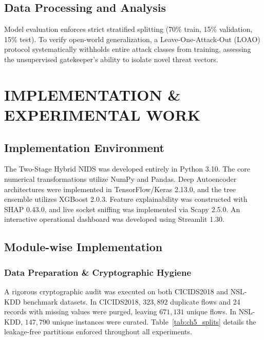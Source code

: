 \documentclass[12pt,a4paper]{report}
\begin{document}
\section{Data Processing and Analysis}
Model evaluation enforces strict stratified splitting (70\% train, 15\% validation, 15\% test). To verify open-world generalization, a Leave-One-Attack-Out (LOAO) protocol systematically withholds entire attack classes from training, assessing the unsupervised gatekeeper's ability to isolate novel threat vectors.

\chapter{IMPLEMENTATION \& EXPERIMENTAL WORK}

\section{Implementation Environment}
The Two-Stage Hybrid NIDS was developed entirely in Python 3.10. The core numerical transformations utilize NumPy and Pandas. Deep Autoencoder architectures were implemented in TensorFlow/Keras 2.13.0, and the tree ensemble utilizes XGBoost 2.0.3. Feature explainability was constructed with SHAP 0.43.0, and live socket sniffing was implemented via Scapy 2.5.0. An interactive operational dashboard was developed using Streamlit 1.30.

\section{Module-wise Implementation}

\subsection{Data Preparation \& Cryptographic Hygiene}
A rigorous cryptographic audit was executed on both CICIDS2018 and NSL-KDD benchmark datasets. In CICIDS2018, $323{,}892$ duplicate flows and 24 records with missing values were purged, leaving $671{,}131$ unique flows. In NSL-KDD, $147{,}790$ unique instances were curated. Table~\ref{tab:ch5_splits} details the leakage-free partitions enforced throughout all experiments.
\end{document}
